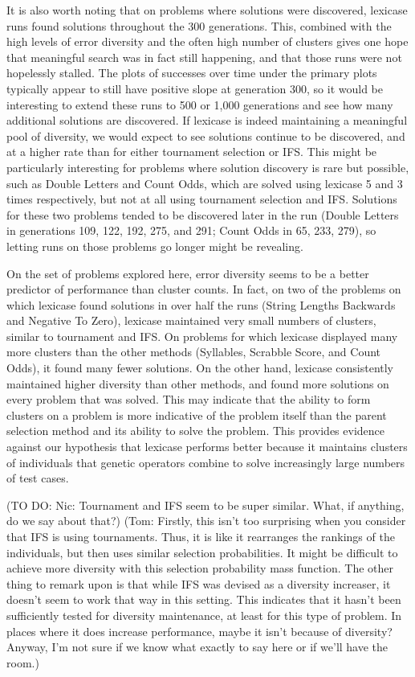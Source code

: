 It is also worth noting that on problems where solutions were discovered, lexicase runs found solutions throughout the 300 generations. This, combined with the high levels of error diversity and the often 
high number of clusters gives one hope that meaningful search was in fact still happening, and that 
those runs were not hopelessly stalled. The plots of successes over time under the primary plots
typically appear to still have positive slope at generation 300, so it would be interesting to
extend these runs to 500 or 1,000 generations and see how many additional solutions are discovered.
If lexicase is indeed maintaining a meaningful pool of diversity, we would expect to see solutions continue
to be discovered, and at a higher rate than for either tournament selection or IFS. This might be
particularly interesting for problems where solution discovery is rare but possible, such as
Double Letters and Count Odds, which are solved using lexicase 5 and 3 times respectively, but not
at all using tournament selection and IFS. Solutions for these two problems tended to be discovered
later in the run (Double Letters in generations 109, 122, 192, 275, and 291; Count Odds in 65, 233, 279), so letting
runs on those problems go longer might be revealing.

On the set of problems explored here, error diversity seems to be a better predictor of performance than cluster counts. In fact, on two of the problems on which lexicase found solutions in over half the runs (String Lengths Backwards and Negative To Zero), lexicase maintained very small numbers of clusters, similar to tournament and IFS. On problems for which lexicase displayed many more clusters than the other methods (Syllables, Scrabble Score, and Count Odds), it found many fewer solutions. On the other hand, lexicase consistently maintained higher diversity than other methods, and found more solutions on every problem that was solved. This may indicate that the ability to form clusters on a problem is more indicative of the problem itself than the parent selection method and its ability to solve the problem. This provides evidence against our hypothesis that lexicase performs better because it maintains clusters of individuals that genetic operators combine to solve increasingly large numbers of test cases.

(TO DO: Nic: Tournament and IFS seem to be super similar. What, if anything, do we say about that?) (Tom: Firstly, this isn't too surprising when you consider that IFS is using tournaments. Thus, it is like it rearranges the rankings of the individuals, but then uses similar selection probabilities. It might be difficult to achieve more diversity with this selection probability mass function. The other thing to remark upon is that while IFS was devised as a diversity increaser, it doesn't seem to work that way in this setting. This indicates that it hasn't been sufficiently tested for diversity maintenance, at least for this type of problem. In places where it does increase performance, maybe it isn't because of diversity? Anyway, I'm not sure if we know what exactly to say here or if we'll have the room.)

